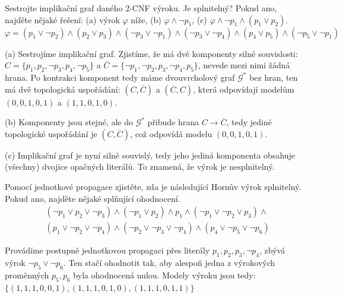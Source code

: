 \begin{problem} \label{problem:2sat}
    
    Sestrojte implikační graf daného 2-CNF výroku. Je splnitelný? Pokud ano, najděte nějaké řešení: (a) výrok $\varphi$ níže, (b) $\varphi\land\neg p_1$, (c) $\varphi\land\neg p_1\land(p_1\lor p_2)$.
    $$
    \varphi=(p_1\vee \neg p_2)\wedge (p_2\vee p_3)\wedge (\neg p_3\vee \neg p_1)\wedge (\neg p_3\vee \neg p_4)\wedge (p_4\vee p_5)\wedge (\neg p_5\vee \neg p_1)
    $$

    \begin{solution}
        (a) Sestrojíme implikační graf. Zjistíme, že má dvě komponenty silné souvislosti: $C=\{p_1,p_2,\neg p_3,p_4,\neg p_5\}$ a $\overline{C}=\{\neg p_1,\neg p_2,p_3,\neg p_4,p_5\}$, nevede mezi nimi žádná hrana. Po kontrakci komponent tedy máme dvouvrcholový graf $\mathcal G^*$ bez hran, ten má dvě topologická uspořádání: $(C,\overline{C})$ a $(\overline{C},C)$, která odpovídají modelům $(0,0,1,0,1)$ a $(1,1,0,1,0)$.
        
        (b) Komponenty jsou stejné, ale do $\mathcal G^*$ přibude hrana $C\to\overline{C}$, tedy jediné topologické uspořádání je $(C,\overline{C})$, což odpovídá modelu $(0,0,1,0,1)$.

        (c) Implikační graf je nyní silně souvislý, tedy jeho jediná komponenta obsahuje (všechny) dvojice opačných literálů. To znamená, že výrok je nesplnitelný.
    \end{solution}

\end{problem}


\begin{problem}

    Pomocí jednotkové propagace zjistěte, zda je následující Hornův výrok splnitelný. Pokud ano, najděte nějaké splňující ohodnocení.
    \begin{align*}
        &(\neg p_1 \vee p_2 \vee \neg p_3)\wedge(\neg p_1 \vee p_2)\wedge p_1 \wedge (\neg p_1 \vee \neg p_2 \vee p_3)\wedge \\
        &(p_1\vee\neg p_2 \vee \neg p_4)\wedge(\neg p_2 \vee \neg p_3 \vee \neg p_4)\wedge(p_4\vee \neg p_5 \vee\neg p_6)
    \end{align*}

    \begin{solution}
        Provádíme postupně jednotkovou propagaci přes literály $p_1,p_2,p_3,\neg p_4$, zbývá výrok $\neg p_5\lor\neg p_6$. Ten stačí ohodnotit tak, aby alespoň jedna z výrokových proměnných $p_5,p_6$ byla ohodnocená nulou. Modely výroku jsou tedy: $\{(1,1,1,0,0,1),(1,1,1,0,1,0),(1,1,1,0,1,1)\}$                
    \end{solution}
    
\end{problem}



